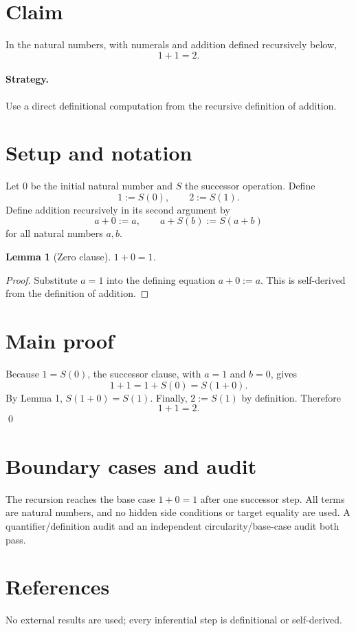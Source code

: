 \documentclass{article}
\newtheorem{lemma}{Lemma}
\begin{document}
\section*{Claim}
In the natural numbers, with numerals and addition defined recursively below,
\[
1+1=2.
\]

\paragraph{Strategy.} Use a direct definitional computation from the recursive definition of addition.

\section*{Setup and notation}
Let $0$ be the initial natural number and $S$ the successor operation. Define
\[
1:=S(0), \qquad 2:=S(1).
\]
Define addition recursively in its second argument by
\[
a+0:=a, \qquad a+S(b):=S(a+b)
\]
for all natural numbers $a,b$.

\begin{lemma}[Zero clause]
$1+0=1$.
\end{lemma}
\begin{proof}
Substitute $a=1$ into the defining equation $a+0:=a$. This is self-derived from the definition of addition.
\end{proof}

\section*{Main proof}
Because $1=S(0)$, the successor clause, with $a=1$ and $b=0$, gives
\[
1+1=1+S(0)=S(1+0).
\]
By Lemma 1, $S(1+0)=S(1)$. Finally, $2:=S(1)$ by definition. Therefore
\[
1+1=2.
\]
\qed

\section*{Boundary cases and audit}
The recursion reaches the base case $1+0=1$ after one successor step. All terms are natural numbers, and no hidden side conditions or target equality are used. A quantifier/definition audit and an independent circularity/base-case audit both pass.

\section*{References}
No external results are used; every inferential step is definitional or self-derived.
\end{document}
